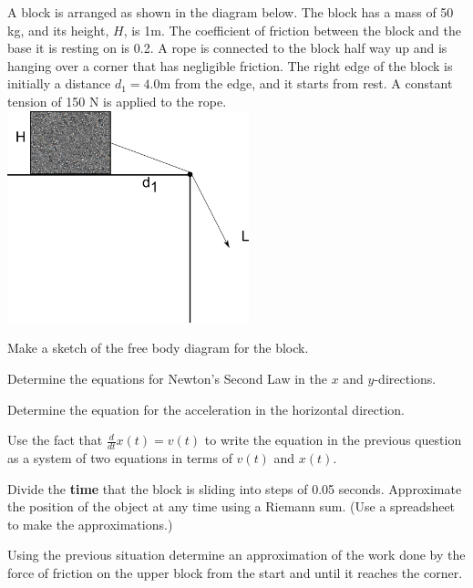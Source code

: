 \begin{problem}
\item A block is arranged as shown in the diagram below. The block has
  a mass of 50 kg, and its height, $H$, is 1m.  The coefficient of
  friction between the block and the base it is resting on is 0.2. A
  rope is connected to the block half way up and is hanging over a
  corner that has negligible friction. The right edge of the block is
  initially a distance $d_1=4.0$m from the edge, and it starts from
  rest. A constant tension of 150 N is applied to the rope. \\
  \includegraphics[width=7cm]{ink/week10/hangingBlocks}

  \begin{subproblem}
    \item Make a sketch of the free body diagram for the block.
      \vfill
    \item Determine the equations for Newton's Second Law in the $x$
      and $y$-directions.
      \vfill
      \clearpage
    \item Determine the equation for the acceleration in the
      horizontal direction.
      \vfill
    \item Use the fact that $\frac{d}{dt} x(t) = v(t)$ to write the
      equation in the previous question as a system of two equations
      in terms of $v(t)$ and $x(t)$.
      \vfill

      \clearpage

    \item Divide the \textbf{time} that the block is sliding into
      steps of 0.05 seconds. Approximate the position of the object at
      any time using a Riemann sum. (Use a spreadsheet to make the
      approximations.)

      \clearpage

  \end{subproblem}

  \clearpage

\item Using the previous situation determine an approximation of the
  work done by the force of friction on the upper block from the start
  and until it reaches the corner.

  \vfill

\end{problem}

